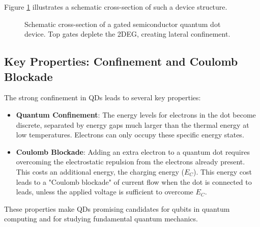 \documentclass{article}
\begin{document}
Figure \ref{fig:cross_section} illustrates a schematic cross-section of such a device structure.

\begin{figure}[h!]
    \centering
    \caption{Schematic cross-section of a gated semiconductor quantum dot device. Top gates deplete the 2DEG, creating lateral confinement.}
    \label{fig:cross_section}
\end{figure}

\subsection{Key Properties: Confinement and Coulomb Blockade}
The strong confinement in QDs leads to several key properties:
\begin{itemize}
    \item \textbf{Quantum Confinement}: The energy levels for electrons in the dot become discrete, separated by energy gaps much larger than the thermal energy at low temperatures. Electrons can only occupy these specific energy states.
    \item \textbf{Coulomb Blockade}: Adding an extra electron to a quantum dot requires overcoming the electrostatic repulsion from the electrons already present. This costs an additional energy, the charging energy ($E_C$). This energy cost leads to a "Coulomb blockade" of current flow when the dot is connected to leads, unless the applied voltage is sufficient to overcome $E_C$.
\end{itemize}
These properties make QDs promising candidates for qubits in quantum computing and for studying fundamental quantum mechanics.
\end{document}
